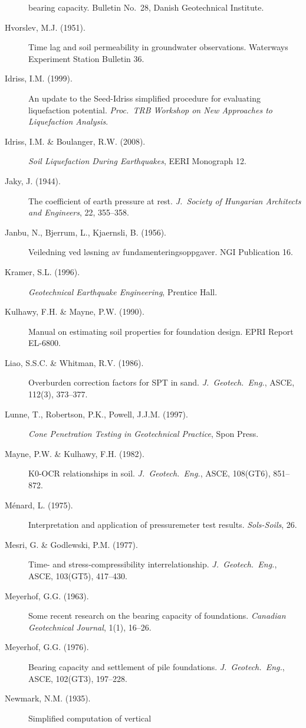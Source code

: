 \documentclass[11pt,a4paper,openany]{book}
\begin{document}
\begin{description}
  bearing capacity. Bulletin No.\ 28, Danish Geotechnical
  Institute.
\item[Hvorslev, M.J. (1951).] Time lag and soil permeability in
  groundwater observations. Waterways Experiment Station Bulletin
  36.
\item[Idriss, I.M. (1999).] An update to the Seed-Idriss simplified
  procedure for evaluating liquefaction potential. \emph{Proc.\
  TRB Workshop on New Approaches to Liquefaction Analysis}.
\item[Idriss, I.M. \& Boulanger, R.W. (2008).] \emph{Soil
  Liquefaction During Earthquakes}, EERI Monograph 12.
\item[Jaky, J. (1944).] The coefficient of earth pressure at rest.
  \emph{J.\ Society of Hungarian Architects and Engineers}, 22,
  355--358.
\item[Janbu, N., Bjerrum, L., Kjaernsli, B. (1956).] Veiledning
  ved l\o{}sning av fundamenteringsoppgaver. NGI Publication 16.
\item[Kramer, S.L. (1996).] \emph{Geotechnical Earthquake
  Engineering}, Prentice Hall.
\item[Kulhawy, F.H. \& Mayne, P.W. (1990).] Manual on estimating
  soil properties for foundation design. EPRI Report EL-6800.
\item[Liao, S.S.C. \& Whitman, R.V. (1986).] Overburden correction
  factors for SPT in sand. \emph{J.\ Geotech.\ Eng.}, ASCE,
  112(3), 373--377.
\item[Lunne, T., Robertson, P.K., Powell, J.J.M. (1997).]
  \emph{Cone Penetration Testing in Geotechnical Practice}, Spon Press.
\item[Mayne, P.W. \& Kulhawy, F.H. (1982).] K0-OCR relationships
  in soil. \emph{J.\ Geotech.\ Eng.}, ASCE, 108(GT6), 851--872.
\item[M\'enard, L. (1975).] Interpretation and application of
  pressuremeter test results. \emph{Sols-Soils}, 26.
\item[Mesri, G. \& Godlewski, P.M. (1977).] Time- and
  stress-compressibility interrelationship. \emph{J.\ Geotech.\
  Eng.}, ASCE, 103(GT5), 417--430.
\item[Meyerhof, G.G. (1963).] Some recent research on the bearing
  capacity of foundations. \emph{Canadian Geotechnical Journal},
  1(1), 16--26.
\item[Meyerhof, G.G. (1976).] Bearing capacity and settlement of
  pile foundations. \emph{J.\ Geotech.\ Eng.}, ASCE, 102(GT3),
  197--228.
\item[Newmark, N.M. (1935).] Simplified computation of vertical

\end{description}
\end{document}
